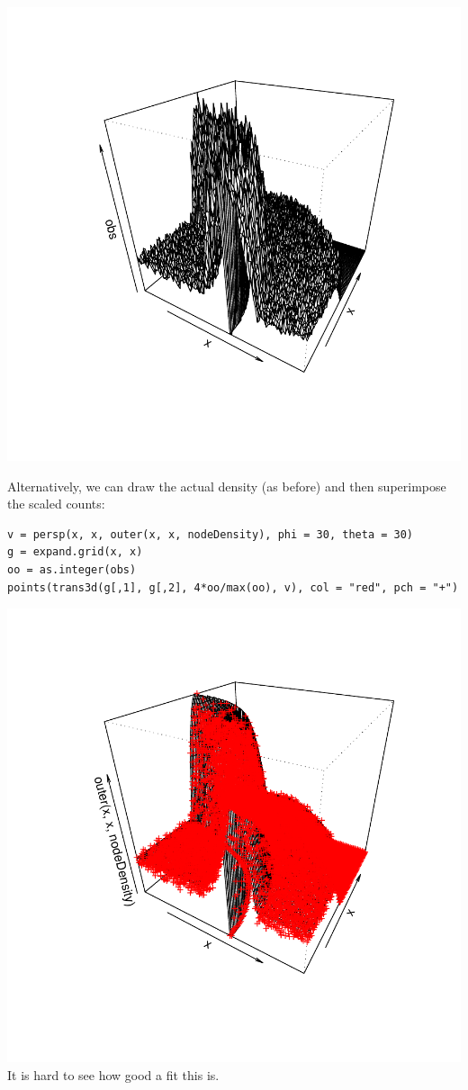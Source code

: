 \documentclass{article}
\begin{document}
\begin{description}
\includegraphics{images/nodeDensitySample.pdf}


Alternatively, we can draw the actual density
(as before) and then superimpose the scaled
counts:
\begin{verbatim}
v = persp(x, x, outer(x, x, nodeDensity), phi = 30, theta = 30)
g = expand.grid(x, x)
oo = as.integer(obs)
points(trans3d(g[,1], g[,2], 4*oo/max(oo), v), col = "red", pch = "+")
\end{verbatim}
\includegraphics{images/nodeDensityPoints.pdf}
It is hard to see how good a fit this is.



\end{description}
\end{document}
